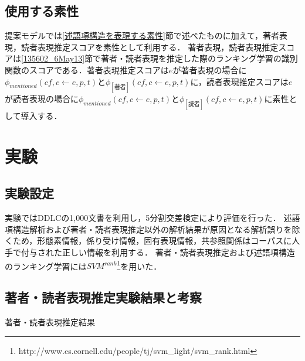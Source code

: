 \documentclass[japanese]{jnlp_1.4}
\begin{document}
\subsection{使用する素性}

提案モデルでは\ref{述語項構造を表現する素性}節で述べたものに加えて，著者表現，読者表現推定スコアを素性として利用する．
著者表現，読者表現推定スコアは\ref{135602_6May13}節で著者・読者表現を推定した際のランキング学習の識別関数のスコアである．著者表現推定スコアは$e$が著者表現の場合に$\phi_\mathit{mentioned}(\mathit{cf},c \leftarrow e,p,t)$と$\phi_{[著者]}(\mathit{cf},c \leftarrow e,p,t)$に，読者表現推定スコアは$e$が読者表現の場合に$\phi_\mathit{mentioned}(\mathit{cf},c \leftarrow e,p,t)$と$\phi_{[読者]}(\mathit{cf},c \leftarrow e,p,t)$に素性として導入する．



\section{実験}
\label{115121_18Jun13}

\subsection{実験設定}

実験ではDDLCの1,000文書を利用し，5分割交差検定により評価を行った．
述語項構造解析および著者・読者表現推定以外の解析結果が原因となる解析誤りを除くため，形態素情報，係り受け情報，固有表現情報，共参照関係はコーパスに人手で付与された正しい情報を利用する．
著者・読者表現推定および述語項構造のランキング学習には$\mathit{SVM}^\mathit{rank}$\footnote{http://www.cs.cornell.edu/people/tj/svm\_light/svm\_rank.html}を用いた．


\subsection{著者・読者表現推定実験結果と考察}

\begin{table}[b]
\caption{著者・読者表現推定結果}
\label{著者・読者推定結果}

\end{table}
\end{document}

